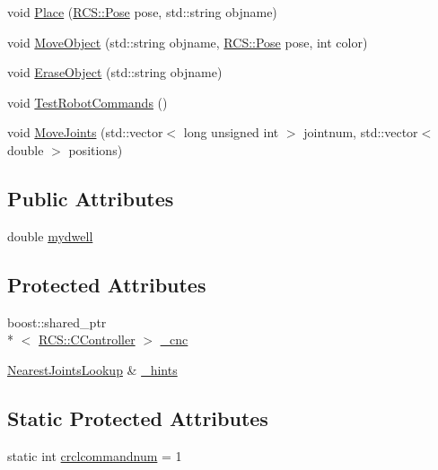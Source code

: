 \begin{DoxyCompactItemize}
\item 
void \hyperlink{classInlineRobotCommands_ae5d97e1a52590a52434aaa2f9235803a}{Place} (\hyperlink{namespaceRCS_aa07e45d8a50e30064283d2b38087f999}{R\-C\-S\-::\-Pose} pose, std\-::string objname)
\item 
void \hyperlink{classInlineRobotCommands_aa3edde0550fe9a01c9a82f39c4afc913}{Move\-Object} (std\-::string objname, \hyperlink{namespaceRCS_aa07e45d8a50e30064283d2b38087f999}{R\-C\-S\-::\-Pose} pose, int color)
\item 
void \hyperlink{classInlineRobotCommands_a0ca748c8f39015ccbe6a93d43b667cec}{Erase\-Object} (std\-::string objname)
\item 
void \hyperlink{classInlineRobotCommands_a9bdbd051bf6c63654580d6cd72265c3d}{Test\-Robot\-Commands} ()
\item 
void \hyperlink{classInlineRobotCommands_a5db059cdcc49da3e7ee21c6bd59f6eed}{Move\-Joints} (std\-::vector$<$ long unsigned int $>$ jointnum, std\-::vector$<$ double $>$ positions)
\end{DoxyCompactItemize}
\subsection*{Public Attributes}
\begin{DoxyCompactItemize}
\item 
double \hyperlink{classInlineRobotCommands_abe4d63965a1a4d3fafa630ace7305fd4}{mydwell}
\end{DoxyCompactItemize}
\subsection*{Protected Attributes}
\begin{DoxyCompactItemize}
\item 
boost\-::shared\-\_\-ptr\\*
$<$ \hyperlink{structRCS_1_1CController}{R\-C\-S\-::\-C\-Controller} $>$ \hyperlink{classInlineRobotCommands_a30ef647cba21bf1ea526f144438d37b7}{\-\_\-cnc}
\item 
\hyperlink{classNearestJointsLookup}{Nearest\-Joints\-Lookup} \& \hyperlink{classInlineRobotCommands_a0089ed745abbe24d8e0229be71deae04}{\-\_\-hints}
\end{DoxyCompactItemize}
\subsection*{Static Protected Attributes}
\begin{DoxyCompactItemize}
\item 
static int \hyperlink{classInlineRobotCommands_a2186bbc7718fcaaaa1841d7a01c726d9}{crclcommandnum} = 1
\end{DoxyCompactItemize}


